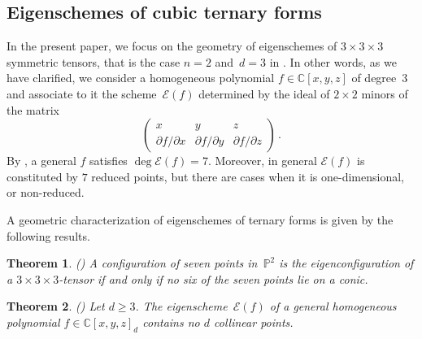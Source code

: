 \documentclass[a4paper, 11pt, reqno]{amsart}
\theoremstyle{plain}
\newtheorem{theoremintro}{Theorem}
\theoremstyle{definition}
\newcommand{\C}{\mathbb{C}}
\newcommand{\p}{\mathbb{P}}
\newcommand{\Eig}[1]{\mathcal{E}\!\left( {#1} \right)}
\begin{document}
\subsection*{Eigenschemes of cubic ternary forms}

In the present paper, we focus on the geometry of eigenschemes of $3\times 3 \times 3$ symmetric tensors, 
that is the case $n=2$ and~$d=3$ in .
In other words, as we have clarified, we consider a homogeneous polynomial $f \in \C[x, y, z]$ of degree~$3$ and associate to it the scheme~$\Eig{f}$ determined by the ideal of $2 \times 2$ minors of the matrix
%
\[
\begin{pmatrix}
    x & y & z \\
    \partial f / \partial x & \partial f / \partial y & \partial f / \partial z
\end{pmatrix} \,.
\]
%
By , a general $f$ satisfies $\deg \Eig{f}=7$.
Moreover, in general $\Eig{f}$ is constituted by $7$ reduced points, but there are cases when it is one-dimensional, or non-reduced. 

A geometric characterization of eigenschemes of ternary forms is given by the following results.

\begin{theoremintro}(\cite[Theorem 5.1]{ASS})
A configuration of seven points in~$\p^2$ is the eigenconfiguration
of a $3 \times 3 \times 3$-tensor if and only if no six of the seven points lie on a conic.
\end{theoremintro}

\begin{theoremintro}(\cite[Theorem 5.7]{BGV})
\label{thm:general_no_d_collinear}
Let $d \ge 3$. The eigenscheme~$\Eig{f}$ of a general homogeneous polynomial $f \in \C[x, y, z]_d$ contains no $d$ collinear points.
\end{theoremintro}
\end{document}

